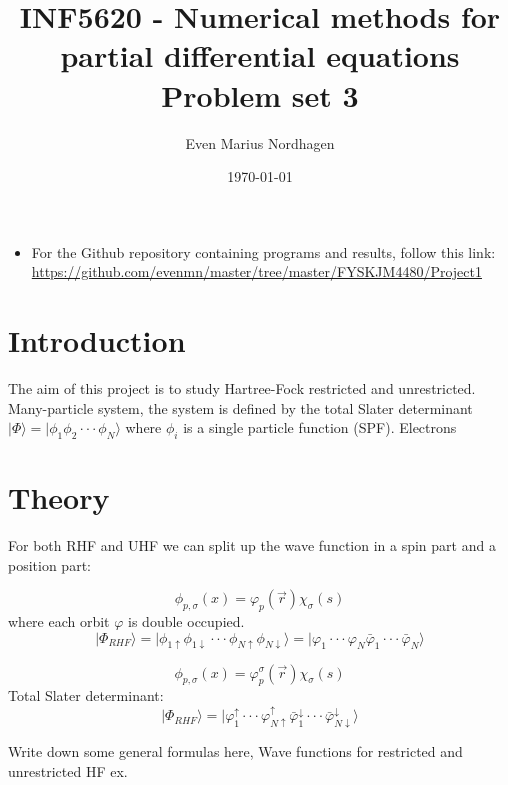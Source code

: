 \documentclass[norsk,a4paper,12pt]{article}
\title{INF5620 - Numerical methods for partial differential equations\\\vspace{2mm} \Large{Problem set 3}}
\author{\large Even Marius Nordhagen}
\date\today
\begin{document}
\maketitle

\begin{itemize}
\item For the Github repository containing programs and results, follow this link: 
\url{https://github.com/evenmn/master/tree/master/FYSKJM4480/Project1}
\end{itemize}

\section{Introduction}
The aim of this project is to study Hartree-Fock restricted and unrestricted. Many-particle system, the system is defined by the total Slater determinant $|\Phi\rangle=|\phi_1\phi_2\cdot\cdot\cdot\phi_N\rangle$ where $\phi_i$ is a single particle function (SPF). Electrons

\section{Theory}
For both RHF and UHF we can split up the wave function in a spin part and a position part:

\begin{equation}
\phi_{p,\sigma}(x)=\varphi_p(\vec{r})\chi_{\sigma}(s)
\end{equation}
where each orbit $\varphi$ is double occupied.
\begin{equation}
|\Phi_{RHF}\rangle=|\phi_{1\uparrow}\phi_{1\downarrow}\cdot\cdot\cdot\phi_{N\uparrow}\phi_{N\downarrow}\rangle=|\varphi_1\cdot\cdot\cdot\varphi_N\bar{\varphi}_1\cdot\cdot\cdot\bar{\varphi}_N\rangle
\end{equation}

\begin{equation}
\phi_{p,\sigma}(x)=\varphi_p^{\sigma}(\vec{r})\chi_{\sigma}(s)
\end{equation}
Total Slater determinant:
\begin{equation}
|\Phi_{RHF}\rangle=|\varphi_1^{\uparrow}\cdot\cdot\cdot\varphi_{N\uparrow}^{\uparrow}\bar{\varphi}_1^{\downarrow}\cdot\cdot\cdot\bar{\varphi}_{N\downarrow}^{\downarrow}\rangle
\end{equation}

Write down some general formulas here, Wave functions for restricted and unrestricted HF ex. 
\end{document}
